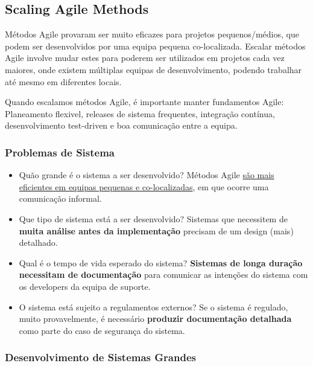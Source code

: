 \documentclass{article}
\begin{document}
\subsection{Scaling Agile Methods}

Métodos Agile provaram ser muito eficazes para projetos
pequenos/médios, que podem ser desenvolvidos por uma equipa
pequena co-localizada.
Escalar métodos Agile involve mudar estes para poderem ser
utilizados em projetos cada vez maiores, onde existem múltiplas
equipas de desenvolvimento, podendo trabalhar até mesmo em diferentes
locais.

\vspace{2mm}

Quando escalamos métodos Agile, é importante manter fundamentos
Agile: Planeamento flexivel, releases de sistema frequentes,
integração contínua, desenvolvimento test-driven e boa comunicação
entre a equipa.

\subsubsection{Problemas de Sistema}

\begin{itemize}
  \item Quão grande é o sistema a ser desenvolvido? Métodos Agile
  \uline{são mais eficientes em equipas pequenas e co-localizadas}, em que
  ocorre uma comunicação informal.

  \item Que tipo de sistema está a ser desenvolvido? Sistemas que necessitem
  de \textbf{muita análise antes da implementação} precisam de um
  design (mais) detalhado.

  \item Qual é o tempo de vida esperado do sistema?
  \textbf{Sistemas de longa duração necessitam de documentação} para comunicar
  as intenções do sistema com os developers da equipa de suporte.

  \item O sistema está sujeito a regulamentos externos?
  Se o sistema é regulado, muito provavelmente, é necessário
  \textbf{produzir documentação detalhada} como parte do caso de segurança do
  sistema.
\end{itemize}

\subsubsection{Desenvolvimento de Sistemas Grandes}
\end{document}
